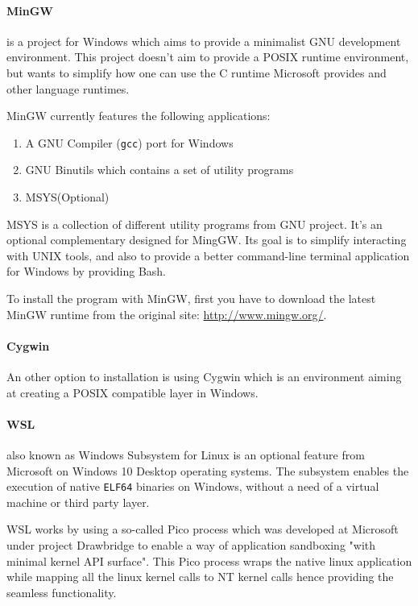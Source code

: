 \paragraph{MinGW} is a project for Windows which aims to provide a minimalist GNU development environment\cite{mingw_homepage}. This project doesn't aim to provide a POSIX runtime environment\cite{mingw_homepage}, but wants to simplify how one can use the C runtime Microsoft provides and other language runtimes. \medskip
\par MinGW currently features the following applications:
\begin{enumerate}
	\item A GNU Compiler (\verb|gcc|) port for Windows
	\item GNU Binutils which contains a set of utility programs
	\item MSYS(Optional)
\end{enumerate}
\par MSYS is a collection of different utility programs from GNU project. It's an optional complementary designed for MingGW\cite{mysis_page}. Its goal is to simplify interacting with UNIX tools, and also to provide a better command-line terminal application for Windows by providing Bash. \medskip
\par To install the program with MinGW, first you have to download the latest MinGW runtime from the original site: \url{http://www.mingw.org/}.
\paragraph{Cygwin}
\par An other option to installation is using Cygwin which is an environment aiming at creating a POSIX compatible layer in Windows. 
\paragraph{WSL}
\par also known as Windows Subsystem for Linux is an optional feature from Microsoft on Windows 10 Desktop operating systems. The subsystem enables the execution of native \verb|ELF64| binaries\cite{wsl_overview} on Windows, without a need of a virtual machine or third party layer. 
\par WSL works by using a so-called Pico process which was developed at Microsoft under project Drawbridge\cite{project_drawbridge} to enable a way of application sandboxing "with minimal kernel API surface"\cite{project_drawbridge}. This Pico process wraps the native linux application while mapping all the linux kernel calls to NT kernel calls hence providing the seamless functionality. 
